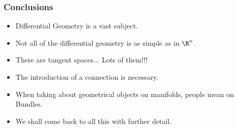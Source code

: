 {
\begin{frame}
  \frametitle{Conclusions}
  \begin{itemize}
  \item Differential Geometry is a vast subject.
  \item Not all of the differential geometry is as simple as in $\R^n$.
  \item There are tangent spaces... Lots of them!!!
  \item The introduction of a connection is necessary.
  \item When taking about geometrical objects on manifolds, people mean on \alert{Bundles}.
  \item We shall come back to all this with further detail.
  \end{itemize}
\end{frame}
}

